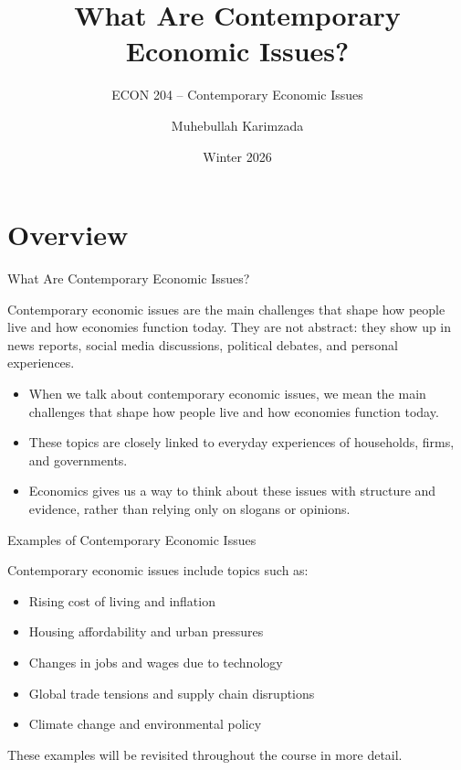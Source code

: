 \documentclass[aspectratio=169]{beamer}
\title[Contemporary Economic Issues]{What Are Contemporary Economic Issues?}
\subtitle{ECON 204 -- Contemporary Economic Issues}
\author{Muhebullah Karimzada}
\date{Winter 2026}
\begin{document}
\begin{frame}
  \titlepage
\end{frame}


\section{Overview}

\begin{frame}{What Are Contemporary Economic Issues?}

  Contemporary economic issues are the main challenges that shape how people live and how
  economies function today. They are not abstract: they show up in news reports, social
  media discussions, political debates, and personal experiences.

  \vspace{0.4cm}

  \begin{itemize}
    \item When we talk about contemporary economic issues, we mean the main challenges that shape
    how people live and how economies function today.
    \item These topics are closely linked to everyday experiences of households, firms, and governments.
    \item Economics gives us a way to think about these issues with structure and evidence, rather than
    relying only on slogans or opinions.
  \end{itemize}
\end{frame}

\begin{frame}{Examples of Contemporary Economic Issues}

  Contemporary economic issues include topics such as:
  \begin{itemize}
    \item Rising cost of living and inflation
    \item Housing affordability and urban pressures
    \item Changes in jobs and wages due to technology
    \item Global trade tensions and supply chain disruptions
    \item Climate change and environmental policy
  \end{itemize}

  \vspace{0.3cm}
  These examples will be revisited throughout the course in more detail.
\end{frame}
\end{document}
